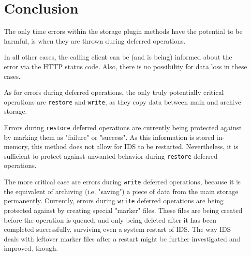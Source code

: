 \documentclass[paper=a4]{scrartcl}
\begin{document}
\section{Conclusion}

The only time errors within the storage plugin methods have the potential to be harmful, is when they are thrown during deferred operations.

In all other cases, the calling client can be (and is being) informed about the error via the HTTP status code.
Also, there is no possibility for data loss in these cases.

As for errors during deferred operations, the only truly potentially critical operations are \texttt{restore} and \texttt{write}, as they copy data between main and archive storage.

Errors during \texttt{restore} deferred operations are currently being protected against by marking them as "failure" or "success".
As this information is stored in-memory, this method does not allow for IDS to be restarted.
Nevertheless, it is sufficient to protect against unwanted behavior during \texttt{restore} deferred operations.

The more critical case are errors during \texttt{write} deferred operations, because it is the equivalent of archiving (i.e. "saving") a piece of data from the main storage permanently.
Currently, errors during \texttt{write} deferred operations are being protected against by creating special "marker" files.
These files are being created before the operation is queued, and only being deleted after it has been completed successfully, surviving even a system restart of IDS.
The way IDS deals with leftover marker files after a restart might be further investigated and improved, though.
\end{document}
